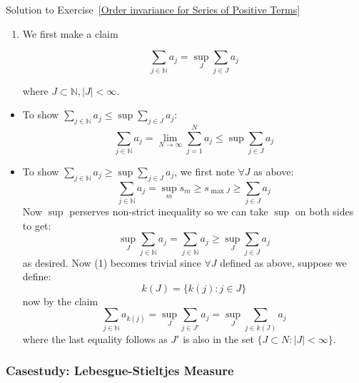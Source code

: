 \begin{mystsolution}{Solution to Exercise~\ref{Order invariance for Series of Positive Terms}}\begin{enumerate}
\item We first make a claim

\begin{equation}
\sum_{j\in \mathbb{N}}a_j = \sup_J \sum_{j\in J} a_j
\end{equation}


where $J\subset \mathbb{N}, |J|<\infty$.
\end{enumerate}

\begin{itemize}
\item To show $\sum_{j\in \mathbb{N}} a_j  \leq \sup \sum_{j\in J} a_j$:
\begin{equation}
\sum_{j\in \mathbb{N}}a_j=\lim_{N\to\infty} \sum_{j=1}^N a_j \leq \sup \sum_{j\in J} a_j
\end{equation}


\item To show $\sum_{j\in \mathbb{N}} a_j  \geq \sup \sum_{j\in J} a_j$, we first note $\forall J$ as above:
\begin{equation}
\sum_{j\in \mathbb{N}} a_j = \sup_m s_m \geq s_{\max J} \geq  \sum_{j\in J} a_j
\end{equation}
Now $\sup$ perserves non-strict inequality so we can take $\sup$ on both sides to get:
\begin{equation}
\sup_{J} \sum_{j\in \mathbb{N}} a_j =  \sum_{j\in \mathbb{N}} a_j \geq  \sup_J \sum_{j\in J} a_j
\end{equation}
as desired.
Now (1) becomes trivial since $\forall J$ defined as above, suppose we define:
\begin{equation}
k(J)=\{k(j): j\in J\}
\end{equation}
now by the claim
\begin{equation}
\sum_{j\in \mathbb{N}} a_{k(j)} = \sup_{J} \sum_{j\in J'} a_j  = \sup_{J} \sum_{j\in k(J)} a_j
\end{equation}
where the last equality follows as $J'$ is also in the set $\{J\subset N: |J|<\infty\}$.
\end{itemize}

\end{mystsolution}
\subsubsection{Casestudy: Lebesgue-Stieltjes Measure}

